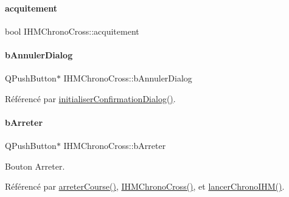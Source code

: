 \paragraph{\texorpdfstring{acquitement}{acquitement}}
{\footnotesize\ttfamily bool I\+H\+M\+Chrono\+Cross\+::acquitement\hspace{0.3cm}{\ttfamily [private]}}

\mbox{\label{class_i_h_m_chrono_cross_a7d2639da4d7d7afae5d2a66e83695a4e}} 
\paragraph{\texorpdfstring{b\+Annuler\+Dialog}{bAnnulerDialog}}
{\footnotesize\ttfamily Q\+Push\+Button$\ast$ I\+H\+M\+Chrono\+Cross\+::b\+Annuler\+Dialog\hspace{0.3cm}{\ttfamily [private]}}



Référencé par \hyperlink{class_i_h_m_chrono_cross_a866a247fad23eca2af31ed985afe7cd3}{initialiser\+Confirmation\+Dialog()}.

\mbox{\label{class_i_h_m_chrono_cross_a75ce4fcdab11095834fe3f9e931f8964}} 
\paragraph{\texorpdfstring{b\+Arreter}{bArreter}}
{\footnotesize\ttfamily Q\+Push\+Button$\ast$ I\+H\+M\+Chrono\+Cross\+::b\+Arreter\hspace{0.3cm}{\ttfamily [private]}}



Bouton Arreter. 



Référencé par \hyperlink{class_i_h_m_chrono_cross_ad3d8f287d08dd9aa0c6b10c9973672a4}{arreter\+Course()}, \hyperlink{class_i_h_m_chrono_cross_a479fc90733fba3e65fb06aa4a3adc02e}{I\+H\+M\+Chrono\+Cross()}, et \hyperlink{class_i_h_m_chrono_cross_a0e78f2d4d5e46c4551fc4517614a56d8}{lancer\+Chrono\+I\+H\+M()}.

\mbox{\label{class_i_h_m_chrono_cross_aec2458a0c2ff0d2c37fa409fb8e99ce7}} 

